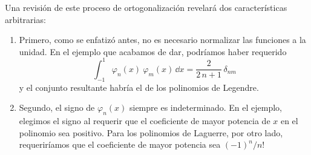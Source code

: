 Una revisión de este proceso de ortogonalización revelará dos características arbitrarias:
\begin{enumerate}
\item Primero, como se enfatizó antes, no es necesario normalizar las funciones a la unidad. En el ejemplo que acabamos de dar, podríamos haber requerido
\begin{equation}
\int_{-1}^{1} \varphi_{n} (x) \: \varphi_{m} (x) \, \dd{x} = \dfrac{2}{2 \, n +1} \, \delta_{nm}
\label{eq:ecuacion_10_61}
\end{equation}
y el conjunto resultante habría el de los polinomios de Legendre.
\item Segundo, el signo de $\varphi_{n} (x)$ siempre es indeterminado. En el ejemplo, elegimos el signo al requerir que el coeficiente de mayor potencia de $x$ en el polinomio sea positivo. Para los polinomios de Laguerre, por otro lado, requeriríamos que el coeficiente de mayor potencia sea $(-1)^{n}/n!$
\end{enumerate}
